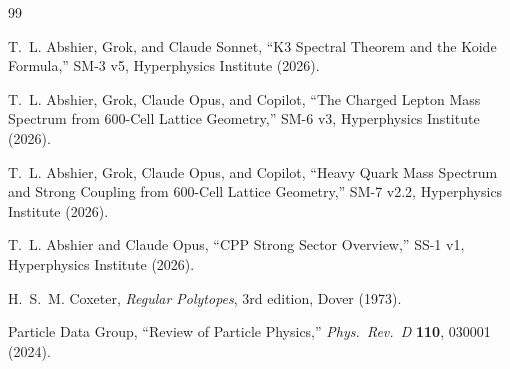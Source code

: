 \documentclass[11pt,letterpaper]{article}
\begin{document}

\begin{thebibliography}{99}

T.~L. Abshier, Grok, and Claude Sonnet,
``K3 Spectral Theorem and the Koide Formula,''
SM-3 v5, Hyperphysics Institute (2026).

T.~L. Abshier, Grok, Claude Opus, and Copilot,
``The Charged Lepton Mass Spectrum from 600-Cell Lattice Geometry,''
SM-6 v3, Hyperphysics Institute (2026).

T.~L. Abshier, Grok, Claude Opus, and Copilot,
``Heavy Quark Mass Spectrum and Strong Coupling from 600-Cell
Lattice Geometry,''
SM-7 v2.2, Hyperphysics Institute (2026).

T.~L. Abshier and Claude Opus,
``CPP Strong Sector Overview,''
SS-1 v1, Hyperphysics Institute (2026).

H.~S.~M. Coxeter,
\emph{Regular Polytopes}, 3rd edition, Dover (1973).

{Particle Data Group},
``Review of Particle Physics,''
\emph{Phys.\ Rev.\ D} \textbf{110}, 030001 (2024).

\end{thebibliography}
\end{document}
